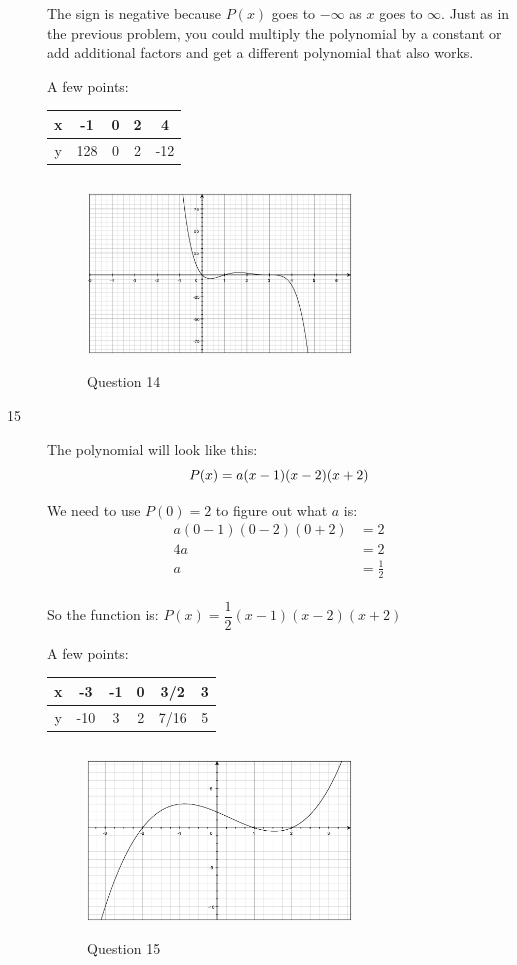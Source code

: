 \documentclass[fleqn,addpoints]{exam}
\begin{document}
\begin{description}
The sign is negative because $P(x)$ goes to $-\infty$ as $x$ goes to $\infty$.  Just as in the previous problem, you
could multiply the polynomial by a constant or add additional factors and get a different polynomial that also works.

A few points:
\begin{tabular}{|c|c|c|c|c|}
\hline
  x & -1  & 0 & 2 & 4 \\
\hline
  y & 128 & 0 & 2 & -12 \\
\hline
\end{tabular}

\begin{figure}[H]
  \centering
  \includegraphics[width=7cm,height=5cm]{question_14.eps}
  \caption*{Question 14}
\end{figure}

\item[15]
The polynomial will look like this: 
\[
  P(x) = a(x-1)(x-2)(x+2) \\
\]

We need to use $P(0) = 2$ to figure out what $a$ is:
\begin{align*}
  a(0-1)(0-2)(0+2) &= 2 \\
  4a &= 2 \\
  a &= \frac{1}{2} \\
\end{align*}

So the function is: $P(x) = \dfrac{1}{2} (x-1) (x-2) (x+2)$

A few points:
\begin{tabular}{|c|c|c|c|c|c|}
\hline
  x & -3  & -1 & 0 & 3/2  & 3 \\
\hline
  y & -10 & 3  & 2 & 7/16 & 5 \\
\hline
\end{tabular}

\begin{figure}[H]
  \centering
  \includegraphics[width=7cm,height=5cm]{question_15.eps}
  \caption*{Question 15}
\end{figure}

\end{description}
\end{document}

